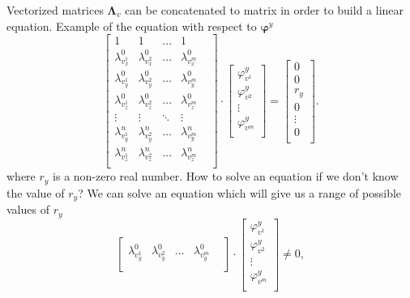 Vectorized matrices $\pmb{\Lambda}_v$
can be concatenated to matrix
in order to build a linear equation.
Example of the equation with respect to $\pmb{\varphi}^y$
\begin{equation}\label{eq:linear:affine}
  \begin{bmatrix}
    1                 & 1                 & \dots  & 1                 & \\
    \lambda^0_{v^1_x} & \lambda^0_{v^2_x} & \dots  & \lambda^0_{v^m_x} & \\
    \lambda^0_{v^1_y} & \lambda^0_{v^2_y} & \dots  & \lambda^0_{v^m_y} & \\
    \lambda^0_{v^1_z} & \lambda^0_{v^2_z} & \dots  & \lambda^0_{v^m_z} & \\
    \vdots            & \vdots            & \ddots & \vdots            & \\
    \lambda^n_{v^1_y} & \lambda^n_{v^2_y} & \dots  & \lambda^n_{v^m_y} & \\
    \lambda^n_{v^1_z} & \lambda^n_{v^2_z} & \dots  & \lambda^n_{v^m_z} & \\
  \end{bmatrix}
  \cdot
  \begin{bmatrix}
    \varphi^y_{v^1} \\
    \varphi^y_{v^2} \\
    \vdots          \\
    \varphi^y_{v^m} \\
  \end{bmatrix}
  =
  \begin{bmatrix}
    0       \\
    0       \\
    r_y     \\
    0       \\
    \vdots  \\
    0       \\
  \end{bmatrix}.
\end{equation}
where $r_y$ is a non-zero real number.
How to solve an equation if we don't know the value of $r_y$?
We can solve an equation which will give us a range of possible values of $r_y$
\begin{equation*}
  \begin{bmatrix}
    \lambda^0_{v^1_y} & \lambda^0_{v^2_y} & \dots & \lambda^0_{v^m_y} & \\
  \end{bmatrix}
  \cdot
  \begin{bmatrix}
    \varphi^y_{v^1} \\
    \varphi^y_{v^2} \\
    \vdots          \\
    \varphi^y_{v^m} \\
  \end{bmatrix}
  \neq 0,
\end{equation*}
